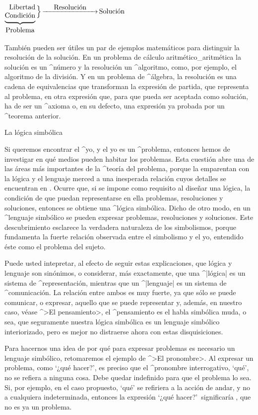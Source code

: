 \bigskip
\centerline{$\underbrace{\vcenter{
  \halign{\strut\hfil\rm#\crcr Libertad\cr Condición\cr}}
    }_{\hbox{\rm\strut Problema}} \, \Bigr\rbrace
 \mathop{\hbox to 80pt{\rightarrowfill}}\limits^{\hbox{\rm Resolución}}
 \hbox{\rm Solución}$}
\bigskip

También pueden ser útiles un par de ejemplos matemáticos para distinguir
la resolución de la solución. En un problema de cálculo
aritmético_{aritmética} la solución es un ^{número} y la resolución un
^{algoritmo}, como, por ejemplo, el algoritmo de la división. Y en un
problema de ^{álgebra}, la resolución es una cadena de equivalencias que
transforman la expresión de partida, que representa al problema, en otra
expresión que, para que pueda ser aceptada como solución, ha de ser un
^{axioma} o, en su defecto, una expresión ya probada por un ^{teorema}
anterior.


\Section La lógica simbólica

Si queremos encontrar el ^{yo}, y el yo es un ^{problema}, entonces
hemos de investigar en qué medios pueden habitar los problemas. Esta
cuestión abre una de las áreas más importantes de la ^{teoría del
problema}, porque la emparentan con la lógica y el lenguaje merced a una
inesperada relación cuyos detalles se encuentran en . Ocurre que,
si se impone como requisito al diseñar una lógica, la condición de que
puedan representarse en ella problemas, resoluciones y soluciones,
entonces se obtiene una ^{lógica simbólica}. Dicho de otro modo, en un
^{lenguaje simbólico} se pueden expresar problemas, resoluciones y
soluciones. Este descubrimiento esclarece la verdadera naturaleza de los
simbolismos, porque fundamenta la fuerte relación observada entre el
simbolismo y el yo, entendido éste como el problema del sujeto.

Puede usted intepretar, al efecto de seguir estas explicaciones, que
lógica y lenguaje son sinónimos, o considerar, más exactamente, que una
^|lógica| es un sistema de ^{representación}, mientras que un
^|lenguaje| es un sistema de ^{comunicación}. La relación entre ambos es
muy fuerte, ya que sólo se puede comunicar, o expresar, aquello que se
puede representar y, además, en nuestro caso, véase ^>El pensamiento>,
el ^{pensamiento} es el habla simbólica muda, o sea, que seguramente
nuestra lógica simbólica es un lenguaje simbólico interiorizado, pero es
mejor no distraerse ahora con estas disquisiciones.

Para hacernos una idea de por qué para expresar problemas es necesario
un lenguaje simbólico, retomaremos el ejemplo de ^>El pronombre>. Al
expresar un problema, como `¿qué hacer?', es preciso que el ^{pronombre}
interrogativo, `qué', no se refiera a ninguna cosa. Debe quedar
indefinido para que el problema lo sea. Si, por ejemplo, en el caso
propuesto, `qué' se refiriera a la acción de andar, y no a cualquiera
indeterminada, entonces la expresión `¿qué hacer?'\ significaría
, que no es ya un problema.

